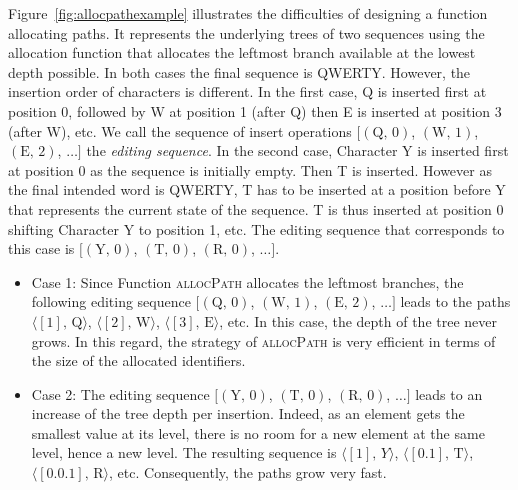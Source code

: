 \begin{figure*}
  \centering
  \hspace{50pt}
  \caption{\label{fig:allocpathexample} Two trees filled with the resulting
    identifiers of two different permutations resulting in an identical sequence
    QWERTY. They use the same function \textsc{allocPath} which allocates the
    leftmost branch in the tree. All paths of the nearly optimal case have a
    length of 1 while the tree of the worst case grows up to a depth of 6.}
\end{figure*}

Figure~\ref{fig:allocpathexample} illustrates the difficulties of designing a
function allocating paths. It represents the underlying trees of two sequences
using the allocation function that allocates the leftmost branch available at
the lowest depth possible. In both cases the final sequence is QWERTY. However,
the insertion order of characters is different. In the first case, Q is inserted
first at position 0, followed by W at position 1 (after Q) then E is inserted at
position 3 (after W), etc. We call the sequence of insert operations
$[(\text{Q},\,0)$, $(\text{W},\,1)$, $(\text{E},\,2)$, $\ldots]$ the
\emph{editing sequence}. In the second case, Character Y is inserted first at
position 0 as the sequence is initially empty. Then T is inserted. However as
the final intended word is QWERTY, T has to be inserted at a position before Y
that represents the current state of the sequence. T is thus inserted at
position 0 shifting Character Y to position 1, etc. The editing sequence that
corresponds to this case is $[(\text{Y},\,0)$, $(\text{T},\,0)$,
$(\text{R},\,0)$, $\ldots]$.


\begin{itemize}
\item Case 1: Since Function \textsc{allocPath} allocates the leftmost branches,
  the following editing sequence $[(\text{Q},\,0)$, $(\text{W},\,1)$,
  $(\text{E},\,2)$, $\ldots]$ leads to the paths
  $\langle [1],\, \text{Q}\rangle$, $\langle [2],\, \text{W}\rangle$,
  $\langle [3],\, \text{E}\rangle$, etc. In this case, the depth of the tree
  never grows. In this regard, the strategy of \textsc{allocPath} is very
  efficient in terms of the size of the allocated identifiers.

\item Case 2: The editing sequence $[(\text{Y},\,0)$, $(\text{T},\,0)$,
  $(\text{R},\,0)$, $\ldots]$ leads to an increase of the tree depth per
  insertion. Indeed, as an element gets the smallest value at its level, there
  is no room for a new element at the same level, hence a new level. The
  resulting sequence is $\langle [1],\, \text{}Y\rangle$,
  $\langle [0.1],\, \text{T}\rangle$, $\langle [0.0.1],\, \text{R} \rangle$,
  etc. Consequently, the paths grow very fast.
\end{itemize}

